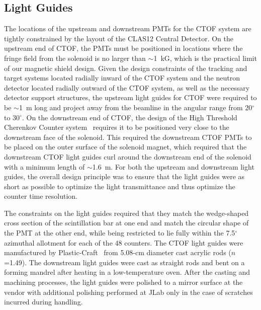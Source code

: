 \documentclass{elsart}
\begin{document}
\subsection{Light Guides}

The locations of the upstream and downstream PMTs for the CTOF system are tightly constrained
by the layout of the CLAS12 Central Detector. On the upstream end of CTOF, the PMTs must
be positioned in locations where the fringe field from the solenoid is no larger than $\sim$1~kG,
which is the practical limit of our magnetic shield design. Given the design constraints of
the tracking and target systems located radially inward of the CTOF system and the neutron
detector located radially outward of the CTOF system, as well as the necessary detector support 
structures, the upstream light guides for CTOF were required to be $\sim$1~m long and project 
away from the beamline in the angular range from 20$^\circ$ to 30$^\circ$. On the downstream 
end of CTOF, the design of the High Threshold Cherenkov Counter system~\cite{htcc-ref} requires
it to be positioned very close to the downstream face of the solenoid. This required the downstream
CTOF PMTs to be placed on the outer surface of the solenoid magnet, which required that the
downstream CTOF light guides curl around the downstream end of the solenoid with a minimum length
of $\sim$1.6~m. For both the upstream and downstream light guides, the overall design principle was 
to ensure that the light guides were as short as possible to optimize the light transmittance and 
thus optimize the counter time resolution.

The constraints on the light guides required that they match the wedge-shaped cross section
of the scintillation bar at one end and match the circular shape of the PMT at the other end,
while being restricted to lie fully within the 7.5$^\circ$ azimuthal allotment for each of the
48 counters. The CTOF light guides were manufactured by Plastic-Craft~\cite{plas-ref} from
5.08-cm diameter cast acrylic rods ($n$=1.49). The downstream light guides were cast as straight
rods and bent on a forming mandrel after heating in a low-temperature oven. After the casting and 
machining processes, the light guides were polished to a mirror surface at the vendor with 
additional polishing performed at JLab only in the case of scratches incurred during handling.
\end{document}

